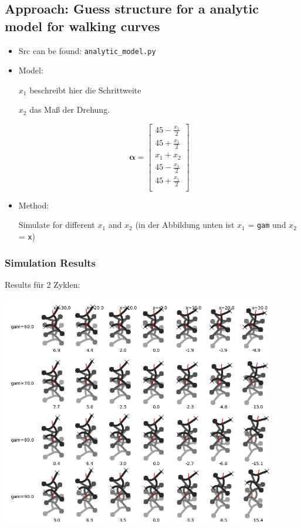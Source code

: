 \documentclass[10pt,a4paper]{article}
\begin{document}
\subsection{Approach: Guess structure for a analytic model for walking curves}

\begin{itemize}

\item Src can be found: \texttt{analytic\_model.py}

\item Model:

$x_1$ beschreibt hier die Schrittweite

$x_2$ das Maß der Drehung.

\begin{equation}
\bm{\alpha} = \begin{bmatrix}
45 - \frac{x_1}{2} \\
45 + \frac{x_1}{2} \\
x_1 + x_2 \\
45 - \frac{x_1}{2}  \\
45 + \frac{x_1}{2} \\
\end{bmatrix}
\end{equation}

\item Method:

Simulate for different $x_1$ and $x_2$ (in der Abbildung unten ist $x_1$ = \texttt{gam} und $x_2$ = \texttt{x})


\end{itemize}


\subsubsection{Simulation Results}

Results für 2 Zyklen:

\includegraphics[width=12cm]{pics/model_1/GeckoBotGait_2cyc.png}
\end{document}
